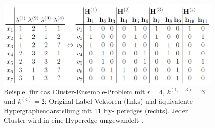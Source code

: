 \documentclass[runningheads]{llncs}
\begin{document}
\begin{figure}[t]
	\begin{center}
		\includegraphics[width=\textwidth]{tablle1}
		\caption{Beispiel für das Cluster-Ensemble-Problem mit $r = 4$, $k^{(1, \ldots, 3)} = 3$ und $k^{(4)} = 2$: Original-Label-Vektoren (links) und äquivalente Hypergraphendarstellung mit 11 Hy-
			peredges (rechts). Jeder Cluster wird in eine Hyperedge umgewandelt \cite{strehl2002cluster}.}
	\end{center}	
\end{figure}
\end{document}
